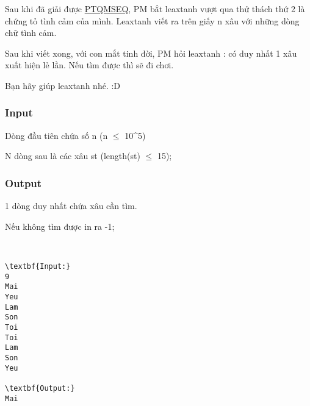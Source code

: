 

Sau khi đã giải được \href{http://vnoi.info/problems/show/PTQMSEQ/}{PTQMSEQ}, PM bắt leaxtanh vượt qua thử thách thứ 2 là chứng tỏ tình cảm của mình. Leaxtanh viết ra trên giấy n xâu với những dòng chữ tình cảm.

Sau khi viết xong, với con mắt tinh đời, PM hỏi leaxtanh : có duy nhất 1 xâu xuất hiện lẻ lần. Nếu tìm được thì sẽ đi chơi.

Bạn hãy giúp leaxtanh nhé. :D

\subsubsection{Input}

Dòng đầu tiên chứa số n (n  $\le$  10\textasciicircum5)

N dòng sau là các xâu st (length(st)  $\le$ 15);

\subsubsection{Output}

1 dòng duy nhất chứa xâu cần tìm.

Nếu không tìm được in ra -1;

 
\begin{verbatim}
\textbf{Input:}
9
Mai
Yeu
Lam
Son
Toi
Toi 
Lam
Son
Yeu

\textbf{Output:}
Mai\end{verbatim}

